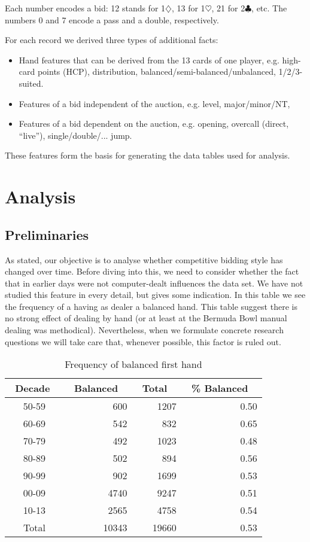 \documentclass{llncs}
\begin{document}
Each number encodes a bid: 12 stands for
1$\diamondsuit$, 13 for 1$\heartsuit$, 21 for 2$\clubsuit$, etc. The numbers
0 and 7 encode a pass and a double, respectively. 

For each record we derived three types of additional facts: 
\begin{itemize}
\item Hand features that can be derived from the 13 cards
of one player, e.g. high-card points (HCP), distribution,
balanced/semi-balanced/unbalanced, 1/2/3-suited.
\item Features of a bid independent of the auction,
e.g. level, major/minor/NT, 
\item Features of a bid dependent on the auction, e.g. opening,
overcall (direct, ``live''), single/double/... jump. 
\end{itemize}
 
These features form the basis for generating the data tables used for
analysis. 


\section{Analysis}
\label{sec:analysis}

\subsection{Preliminaries}

As stated, our objective is to analyse whether competitive bidding
style  has changed over time.  Before diving into this, we need to consider
whether the fact that in earlier days were not computer-dealt
influences the data set. We have not studied this feature in every detail,
but  gives some indication. In this table
we see the frequency of a having as dealer a balanced hand. This table
suggest there is no strong effect of dealing by hand (or at least at
the Bermuda Bowl manual dealing was methodical). Nevertheless, when we
formulate concrete research questions we will take care that, whenever
possible, this factor is ruled out.     

\begin{table}
\caption{Frequency of balanced first hand}
\label{tbl:balanced-first-hand}
\centering\footnotesize
\begin{tabular}{|c|r|r|r|}
\hline
\bf \ Decade \ & \bf \ Balanced \ & \bf \ Total \  & \bf \ \% Balanced \ \\ \hline 
50-59 & 600 & 1207 & 0.50 \\
60-69 & 542 & 832 & 0.65 \\
70-79 & 492 & 1023 & 0.48 \\
80-89 & 502 & 894 & 0.56 \\
90-99 & 902 & 1699 & 0.53 \\
00-09 & 4740 & 9247 & 0.51 \\
10-13 & 2565 & 4758 & 0.54 \\ \hline
Total & 10343 & 19660 & 0.53 \\
\hline
\end{tabular}
\end{table}
\end{document}
